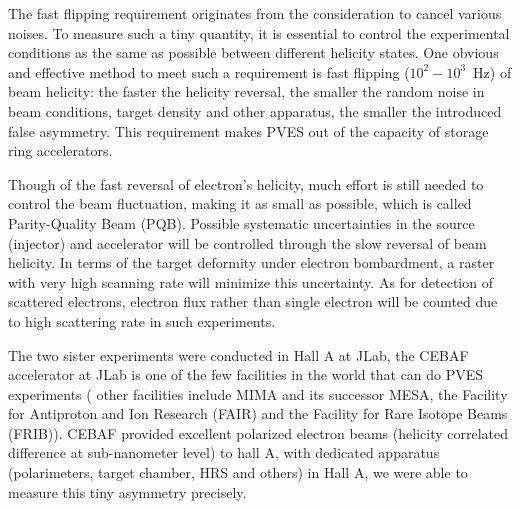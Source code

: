 The fast flipping requirement originates from the consideration to cancel various 
noises. To measure such a tiny quantity, it is essential to control
the experimental conditions as the same as possible between different
helicity states. One obvious and effective method to meet such a requirement is fast 
flipping ($10^2 - 10^3$~Hz) of beam helicity: the faster the helicity reversal, the smaller
the random noise in beam conditions, target density and other apparatus, the smaller
the introduced false asymmetry. This requirement makes PVES out of the capacity
of storage ring accelerators.

Though of the fast reversal of electron's helicity, much effort is still needed to
control the beam fluctuation, making it as small as possible, which is called
Parity-Quality Beam (PQB). Possible systematic uncertainties in the source (injector) 
and accelerator will be controlled through the slow reversal of beam helicity. 
In terms of the target deformity under electron bombardment,
a raster with very high scanning rate will minimize this uncertainty. As for 
detection of scattered electrons, electron flux rather than single electron will
be counted due to high scattering rate in such experiments.

The two sister experiments were conducted in Hall A at JLab, the CEBAF accelerator 
at JLab is one of the few facilities in the world that can do PVES experiments (
other facilities include MIMA and its successor MESA, the Facility for Antiproton
and Ion Research (FAIR) and the Facility for Rare Isotope Beams (FRIB)). CEBAF 
provided excellent polarized electron beams (helicity correlated difference at 
sub-nanometer level) to hall A, with dedicated apparatus 
(polarimeters, target chamber, HRS and others) in Hall A, we were able 
to measure this tiny asymmetry precisely.

